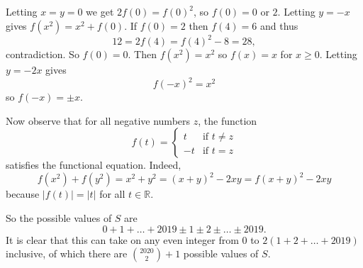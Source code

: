 Letting $x=y=0$ we get $2f\left(0\right)=f\left(0\right)^2$, so $f\left(0\right)=0$ or $2$. Letting $y=-x$ gives $f\left(x^2\right)=x^2+f\left(0\right)$. If $f\left(0\right)=2$ then $f\left(4\right)=6$ and thus \[12=2f\left(4\right)=f\left(4\right)^2-8=28,\] contradiction. So $f\left(0\right)=0$. Then $f\left(x^2\right)=x^2$ so $f\left(x\right)=x$ for $x\geq0$. Letting $y=-2x$ gives \[f\left(-x\right)^2=x^2\] so $f\left(-x\right)=\pm x$.

Now observe that for all negative numbers $z$, the function \[f\left(t\right)=\begin{cases}
	t & \text{if }t\neq z \\
	-t & \text{if }t=z
\end{cases}
\] satisfies the functional equation. Indeed, \[f\left(x^2\right)+f\left(y^2\right)=x^2+y^2=\left(x+y\right)^2-2xy=f\left(x+y\right)^2-2xy\] because $\left|f\left(t\right)\right|=\left|t\right|$ for all $t\in\mathbb{R}$.

So the possible values of $S$ are \[0+1+\ldots+2019\pm1\pm2\pm\ldots\pm2019.\] It is clear that this can take on any even integer from $0$ to $2\left(1+2+\ldots+2019\right)$ inclusive, of which there are $\boxed{\binom{2020}{2}+1}$ possible values of $S$.